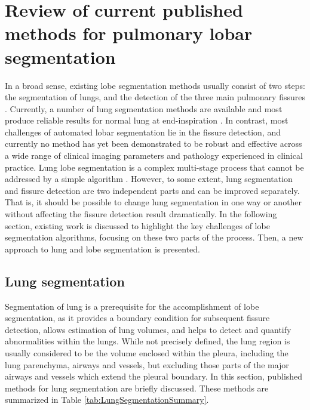 \section{Review of current published methods for pulmonary lobar segmentation} \label{SegmentationReview}
In a broad sense, existing lobe segmentation methods usually consist of two steps: the segmentation of lungs, and the detection of the three main pulmonary fissures \citep{van2013automated}. Currently, a number of lung segmentation methods are available and most produce reliable results for normal lung at end-inspiration \citep{hu2001automatic,ukil2005smoothing,sun20063d,pu2008adaptive,wang2009automated}. In contrast, most challenges of automated lobar segmentation lie in the fissure detection, and currently no method has yet been demonstrated to be robust and effective across a wide range of clinical imaging parameters and pathology experienced in clinical practice. Lung lobe segmentation is a complex multi-stage process that cannot be addressed by a simple algorithm \citep{van2013automated,pu2009computational,ukil2009anatomy}. However, to some extent, lung segmentation and fissure detection are two independent parts and can be improved separately. That is, it should be possible to change lung segmentation in one way or another without affecting the fissure detection result dramatically. In the following section, existing work is discussed to highlight the key challenges of lobe segmentation algorithms, focusing on these two parts of the process. Then, a new approach to lung and lobe segmentation is presented.

\subsection{Lung segmentation}
Segmentation of lung is a prerequisite for the accomplishment of lobe segmentation, as it provides a boundary condition for subsequent fissure detection, allows estimation of lung volumes, and helps to detect and quantify abnormalities within the lungs. While not precisely defined, the lung region is usually considered to be the volume enclosed within the pleura, including the lung parenchyma, airways and vessels, but excluding those parts of the major airways and vessels which extend the pleural boundary. In this section, published methods for lung segmentation are briefly discussed. These methods are summarized in Table \ref{tab:LungSegmentationSummary}.

